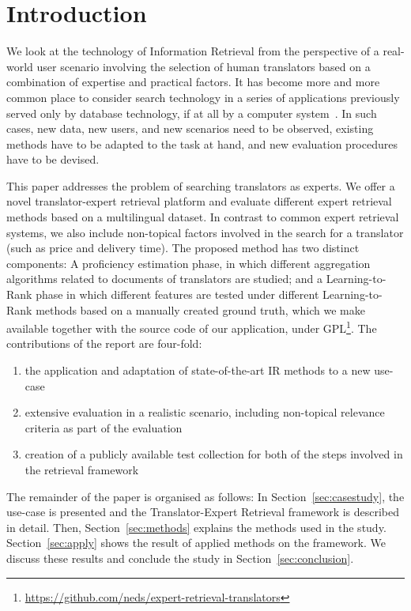 \section{Introduction}
\label{sec:introduction}
We look at the technology of Information Retrieval from the perspective of a real-world user scenario involving the selection of human translators based on a combination of expertise and practical factors. 
It has become more and more common place to consider search technology in a series of applications previously served only by database technology, if at all by a computer system~\cite{Grefenstette:2011}. In such cases, new data, new users, and new scenarios need to be observed, existing methods have to be adapted to the task at hand, and new evaluation procedures have to be devised. 

This paper addresses the problem of searching translators as experts. We offer a novel translator-expert retrieval platform and evaluate different expert retrieval methods based on a multilingual dataset. In contrast to common expert retrieval systems, we also include non-topical factors involved in the search for a translator (such as price and delivery time).%
 The proposed method has two distinct components: A proficiency estimation phase, in which different aggregation algorithms related to documents of translators are studied; and a Learning-to-Rank phase in which different features are tested under different Learning-to-Rank methods based on a manually created ground truth, which we make available together with the source code of our application, under GPL\footnote{\url{https://github.com/neds/expert-retrieval-translators}}. The contributions of the report are four-fold:
\begin{enumerate}
\item the application and adaptation of state-of-the-art IR methods to a new use-case
\item extensive evaluation in a realistic scenario, including non-topical relevance criteria as part of the evaluation
\item creation of a publicly available test collection for both of the steps involved in the retrieval framework
\end{enumerate}

The remainder of the paper is organised as follows: In Section~\ref{sec:casestudy}, the use-case is presented and the Translator-Expert Retrieval framework is described in detail. Then, Section~\ref{sec:methods} explains the methods used in the study. Section~\ref{sec:apply} shows the result of applied methods on the framework. We discuss these results and conclude the study in Section~\ref{sec:conclusion}.
